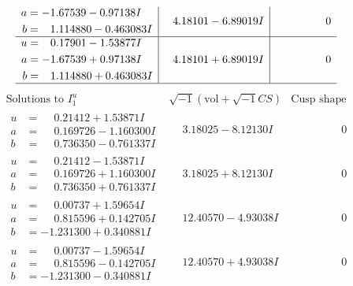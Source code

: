 \documentclass[1p]{elsarticle_modified}
\theoremstyle{definition}
\newcommand{\I}{\sqrt{-1}}
\begin{document}
$$\begin{array}{c|c|c}
\begin{aligned}
a &= -1.67539 - 0.97138 I \\
b &= \phantom{-}1.114880 - 0.463083 I\end{aligned}
 & \phantom{-}4.18101 - 6.89019 I & \phantom{-0.000000 } 0 \\ \hline\begin{aligned}
u &= \phantom{-}0.17901 - 1.53877 I \\
a &= -1.67539 + 0.97138 I \\
b &= \phantom{-}1.114880 + 0.463083 I\end{aligned}
 & \phantom{-}4.18101 + 6.89019 I & \phantom{-0.000000 } 0\\
 \hline 
 \end{array}$$\newpage$$\begin{array}{c|c|c}  
\text{Solutions to }I^u_{1}& \I (\text{vol} + \sqrt{-1}CS) & \text{Cusp shape}\\
 \hline 
\begin{aligned}
u &= \phantom{-}0.21412 + 1.53871 I \\
a &= \phantom{-}0.169726 - 1.160300 I \\
b &= \phantom{-}0.736350 - 0.761337 I\end{aligned}
 & \phantom{-}3.18025 - 8.12130 I & \phantom{-0.000000 } 0 \\ \hline\begin{aligned}
u &= \phantom{-}0.21412 - 1.53871 I \\
a &= \phantom{-}0.169726 + 1.160300 I \\
b &= \phantom{-}0.736350 + 0.761337 I\end{aligned}
 & \phantom{-}3.18025 + 8.12130 I & \phantom{-0.000000 } 0 \\ \hline\begin{aligned}
u &= \phantom{-}0.00737 + 1.59654 I \\
a &= \phantom{-}0.815596 + 0.142705 I \\
b &= -1.231300 + 0.340881 I\end{aligned}
 & \phantom{-}12.40570 - 4.93038 I & \phantom{-0.000000 } 0 \\ \hline\begin{aligned}
u &= \phantom{-}0.00737 - 1.59654 I \\
a &= \phantom{-}0.815596 - 0.142705 I \\
b &= -1.231300 - 0.340881 I\end{aligned}
 & \phantom{-}12.40570 + 4.93038 I & \phantom{-0.000000 } 0 \\ \hline\begin{aligned}

\end{aligned}
\end{array}$$
\end{document}

